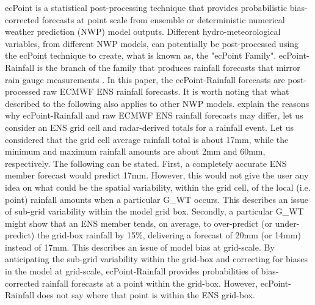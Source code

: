 \documentclass[twocol]{ametsocV5} %
\begin{document}
ecPoint is a statistical post-processing technique that provides probabilistic bias-corrected forecasts at point scale from ensemble or deterministic numerical weather prediction (NWP) model outputs. Different hydro-meteorological variables, from different NWP models, can potentially be post-processed using the ecPoint technique to create, what is known as, the "ecPoint Family". ecPoint-Rainfall is the branch of the family that produces rainfall forecasts that mirror rain gauge measurements \citep{Hewson2020a}. In this paper, the ecPoint-Rainfall forecasts are post-processed raw ECMWF ENS rainfall forecasts. It is worth noting that what described to the following also applies to other NWP models. \parTo explain the reasons why ecPoint-Rainfall and raw ECMWF ENS rainfall forecasts may differ, let us consider an ENS grid cell and radar-derived totals for a rainfall event. Let us considered that the grid cell average rainfall total is about 17mm, while the minimum and maximum rainfall amounts are about 2mm and 60mm, respectively. The following can be stated. First, a completely accurate ENS member forecast would predict 17mm. However, this would not give the user any idea on what could be the spatial variability, within the grid cell, of the local (i.e. point) rainfall amounts when a particular G\_WT occurs. This describes an issue of sub-grid variability within the model grid box. Secondly, a particular G\_WT might show that an ENS member tends, on average, to over-predict (or under-predict) the grid-box rainfall by 15\%, delivering a forecast of 20mm (or 14mm) instead of 17mm. This describes an issue of model bias at grid-scale. By anticipating the sub-grid variability within the grid-box and correcting for biases in the model at grid-scale, ecPoint-Rainfall provides probabilities of bias-corrected rainfall forecasts at a point within the grid-box. However, ecPoint-Rainfall does not say where that point is within the ENS grid-box. \par
\end{document}
